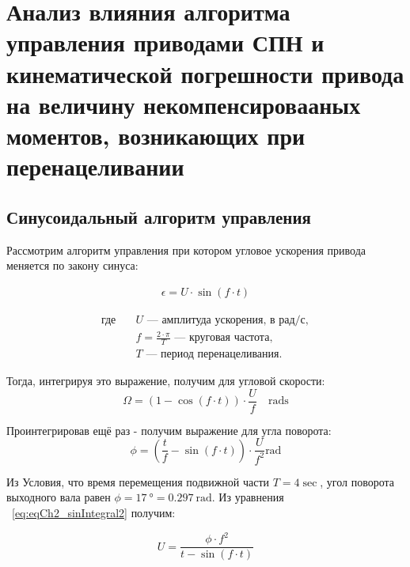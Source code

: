 \chapter{Анализ влияния алгоритма управления приводами СПН и кинематической погрешности привода на величину некомпенсировааных моментов, возникающих при перенацеливании}\label{ch:ch2}

\section{Синусоидальный алгоритм управления}\label{sec:ch2/sec1}

Рассмотрим алгоритм управления при котором угловое ускорения привода меняется по закону синуса:

\begin{samepage}
	\begin{equation}
		\label{eq:eqCh2_sin}
		\begin{aligned}
			\epsilon = U \cdot \sin(f \cdot t)
		\end{aligned}	
	\end{equation}
	
	\begin{align*}
		\text{где} \quad 
		& U \text{ — амплитуда ускорения, в } \text{рад/с}, \\           
		& f = \frac{2 \cdot \pi}{T} \text{ — круговая частота}, \\       
		& T \text{ — период перенацеливания.}
	\end{align*}
\end{samepage}
	
Тогда, интегрируя это выражение, получим для угловой скорости:
\begin{equation}
	\label{eq:eqCh2_sinIntegral}
	\Omega = \left(1 - \cos\left(f \cdot t\right)\right) \cdot \frac{U}{f} \quad \si{\radian\second}
\end{equation}

Проинтегрировав ещё раз - получим выражение для угла поворота:
\begin{equation}
	\label{eq:eqCh2_sinIntegral2}
	\phi = \left( \frac{t}{f} - \sin\left(f \cdot t\right) \right) \cdot \frac{U}{f^2} \si{\radian}
\end{equation}

Из Условия, что время перемещения подвижной части $T = 4 \si{\sec}$, угол поворота выходного вала равен $\phi = \SI{17}{\degree} = \SI{0.297}{\radian}$.
Из уравнения ~\cref{eq:eqCh2_sinIntegral2} получим:

\begin{equation}
	\label{eq:eqCh2_Uacc}
	U = \frac{\phi \cdot f^2}{t - \sin(f \cdot t)}
\end{equation}

